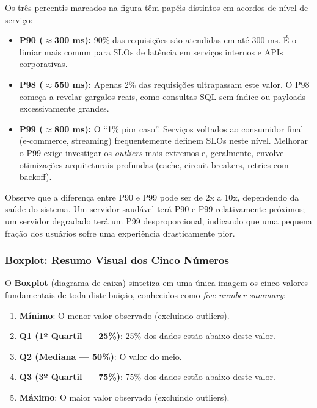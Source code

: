 \documentclass[12pt,a4paper,twoside]{report}
\begin{document}
Os três percentis marcados na figura têm papéis distintos em acordos de nível de serviço:

\begin{itemize}[nosep]
    \item \textbf{P90 ($\approx$300 ms):} 90\% das requisições são atendidas em até 300 ms. É o limiar mais comum para SLOs de latência em serviços internos e APIs corporativas.
    \item \textbf{P98 ($\approx$550 ms):} Apenas 2\% das requisições ultrapassam este valor. O P98 começa a revelar gargalos reais, como consultas SQL sem índice ou payloads excessivamente grandes.
    \item \textbf{P99 ($\approx$800 ms):} O ``1\% pior caso''. Serviços voltados ao consumidor final (e-commerce, streaming) frequentemente definem SLOs neste nível. Melhorar o P99 exige investigar os \textit{outliers} mais extremos e, geralmente, envolve otimizações arquiteturais profundas (cache, circuit breakers, retries com backoff).
\end{itemize}

Observe que a diferença entre P90 e P99 pode ser de 2x a 10x, dependendo da saúde do sistema. Um servidor saudável terá P90 e P99 relativamente próximos; um servidor degradado terá um P99 desproporcional, indicando que uma pequena fração dos usuários sofre uma experiência drasticamente pior.

\subsubsection{Boxplot: Resumo Visual dos Cinco Números}

O \textbf{Boxplot} (diagrama de caixa) sintetiza em uma única imagem os cinco valores fundamentais de toda distribuição, conhecidos como \textit{five-number summary}:

\begin{enumerate}[nosep]
    \item \textbf{Mínimo}: O menor valor observado (excluindo outliers).
    \item \textbf{Q1 (1º Quartil --- 25\%)}: 25\% dos dados estão abaixo deste valor.
    \item \textbf{Q2 (Mediana --- 50\%)}: O valor do meio.
    \item \textbf{Q3 (3º Quartil --- 75\%)}: 75\% dos dados estão abaixo deste valor.
    \item \textbf{Máximo}: O maior valor observado (excluindo outliers).
\end{enumerate}
\end{document}
